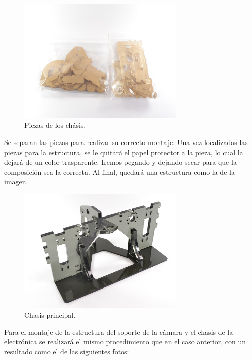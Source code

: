 \begin{figure} [hbtp]
  \begin{center}
    \includegraphics[width=8cm]{img/cap3/3_3/piezas}
  \end{center}
  \caption{Piezas de los chásis.}
  \label{fig:piezas}
\end{figure}

Se separan las piezas para realizar su correcto montaje. Una vez localizadas las piezas para la estructura, se le quitará el papel protector a la pieza, lo cual la dejará de un color trasparente. 
Iremos pegando y dejando secar para que la composición sea la correcta. 
Al final, quedará una estructura como la de la imagen.

\begin{figure} [hbtp]
  \begin{center}
    \includegraphics[width=8cm]{img/cap3/3_3/chasis_ppal}
  \end{center}
  \caption{Chasis principal.}
  \label{fig:chasis_ppal}
\end{figure}

Para el montaje de la estructura del soporte de la cámara y el chasis de la electrónica se realizará el mismo procedimiento que en el caso anterior, con un resultado como el de las siguientes fotos:

